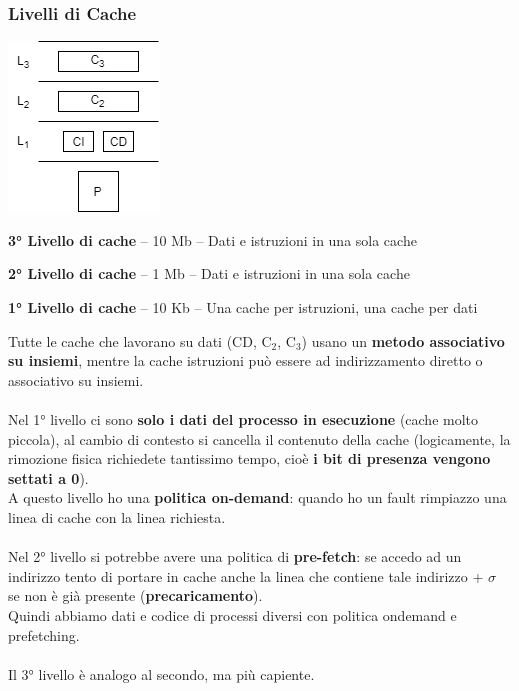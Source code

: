 \documentclass[10pt]{report}
\begin{document}
\subsubsection{Livelli di Cache}
\begin{multicols}{2}
\begin{center}
	\includegraphics[scale=1]{lvcache.png}
\end{center}
\columnbreak
\begin{list}{}{}
	\item \textbf{3° Livello di cache} -- 10 Mb -- Dati e istruzioni in una sola cache
	\item \textbf{2° Livello di cache} -- 1 Mb -- Dati e istruzioni in una sola cache
	\item \textbf{1° Livello di cache} -- 10 Kb -- Una cache per istruzioni, una cache per dati 
\end{list}
\end{multicols}
Tutte le cache che lavorano su dati (CD, C$_2$, C$_3$) usano un \textbf{metodo associativo su insiemi}, mentre la cache istruzioni può essere ad indirizzamento diretto o associativo su insiemi.\\\\
Nel 1° livello ci sono \textbf{solo i dati del processo in esecuzione} (cache molto piccola), al cambio di contesto si cancella il contenuto della cache (logicamente, la rimozione fisica richiedete tantissimo tempo, cioè \textbf{i bit di presenza vengono settati a 0}).\\
A questo livello ho una \textbf{politica on-demand}: quando ho un fault rimpiazzo una linea di cache con la linea richiesta.\\\\
Nel 2° livello si potrebbe avere una politica di \textbf{pre-fetch}: se accedo ad un indirizzo tento di portare in cache anche la linea che contiene tale indirizzo + $\sigma$ se non è già presente (\textbf{precaricamento}).\\
Quindi abbiamo dati e codice di processi diversi con politica ondemand e prefetching.\\\\
Il 3° livello è analogo al secondo, ma più capiente.
\end{document}
